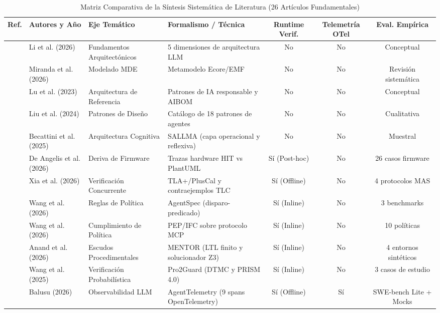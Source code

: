 \documentclass[conference]{IEEEtran}
\begin{document}
\begin{table}[t]
\caption{Matriz Comparativa de la S\'intesis Sistem\'atica de Literatura (26 Art\'iculos Fundamentales)}
\label{tab:lit_comparison}
\centering
\scriptsize
\begin{tabularx}{\textwidth}{lp{2.4cm}p{2.6cm}p{3.2cm}ccc}
\toprule
\textbf{Ref.} & \textbf{Autores y A\~no} & \textbf{Eje Tem\'atico} & \textbf{Formalismo / T\'ecnica} & \textbf{Runtime Verif.} & \textbf{Telemetr\'ia OTel} & \textbf{Eval. Emp\'irica} \\
\midrule
\cite{li2026} & Li et al. (2026) & Fundamentos Arquitect\'onicos & 5 dimensiones de arquitectura LLM & No & No & Conceptual \\
\cite{miranda2026} & Miranda et al. (2026) & Modelado MDE & Metamodelo Ecore/EMF & No & No & Revisi\'on sistem\'atica \\
\cite{lu2023} & Lu et al. (2023) & Arquitectura de Referencia & Patrones de IA responsable y AIBOM & No & No & Conceptual \\
\cite{liu2024} & Liu et al. (2024) & Patrones de Dise\~no & Cat\'alogo de 18 patrones de agentes & No & No & Cualitativa \\
\cite{becattini2025b} & Becattini et al. (2025) & Arquitectura Cognitiva & SALLMA (capa operacional y reflexiva) & No & No & Muestral \\
\midrule
\cite{deangelis2026} & De Angelis et al. (2026) & Deriva de Firmware & Trazas hardware HIT vs PlantUML & S\'i (Post-hoc) & No & 26 casos firmware \\
\cite{xia2026} & Xia et al. (2026) & Verificaci\'on Concurrente & TLA+/PlusCal y contraejemplos TLC & S\'i (Offline) & No & 4 protocolos MAS \\
\cite{wangh2026} & Wang et al. (2026) & Reglas de Pol\'itica & AgentSpec (disparo-predicado) & S\'i (Inline) & No & 3 benchmarks \\
\cite{wangs2026} & Wang et al. (2026) & Cumplimiento de Pol\'itica & PEP/IFC sobre protocolo MCP & S\'i (Inline) & No & 10 pol\'iticas \\
\cite{anand2026} & Anand et al. (2026) & Escudos Procedimentales & MENTOR (LTL finito y solucionador Z3) & S\'i (Inline) & No & 4 entornos sint\'eticos \\
\cite{wangh2025} & Wang et al. (2025) & Verificaci\'on Probabil\'istica & Pro2Guard (DTMC y PRISM 4.0) & S\'i (Inline) & No & 3 casos de estudio \\
\midrule
\cite{balusu2026} & Balusu (2026) & Observabilidad LLM & AgentTelemetry (9 spans OpenTelemetry) & S\'i (Offline) & S\'i & SWE-bench Lite + Mocks \\

\end{tabularx}
\end{table}
\end{document}
